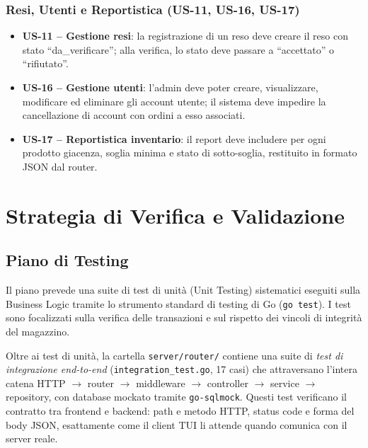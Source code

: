 \documentclass[a4paper,12pt]{article}
\begin{document}
\subsubsection*{Resi, Utenti e Reportistica (US-11, US-16, US-17)}
\begin{itemize}
    \item \textbf{US-11 -- Gestione resi}: la registrazione di un reso deve creare il reso con stato ``da\_verificare''; alla verifica, lo stato deve passare a ``accettato'' o ``rifiutato''.
    \item \textbf{US-16 -- Gestione utenti}: l'admin deve poter creare, visualizzare, modificare ed eliminare gli account utente; il sistema deve impedire la cancellazione di account con ordini a esso associati.
    \item \textbf{US-17 -- Reportistica inventario}: il report deve includere per ogni prodotto giacenza, soglia minima e stato di sotto-soglia, restituito in formato JSON dal router.
\end{itemize}

\section{Strategia di Verifica e Validazione}

\subsection{Piano di Testing}
Il piano prevede una suite di test di unità (Unit Testing) sistematici eseguiti sulla Business Logic tramite lo strumento standard di testing di Go (\texttt{go test}). I test sono focalizzati sulla verifica delle transazioni e sul rispetto dei vincoli di integrità del magazzino.

Oltre ai test di unità, la cartella \texttt{server/router/} contiene una suite di \emph{test di integrazione end-to-end} (\texttt{integration\_test.go}, 17 casi) che attraversano l'intera catena HTTP $\rightarrow$ router $\rightarrow$ middleware $\rightarrow$ controller $\rightarrow$ service $\rightarrow$ repository, con database mockato tramite \texttt{go-sqlmock}. Questi test verificano il contratto tra frontend e backend: path e metodo HTTP, status code e forma del body JSON, esattamente come il client TUI li attende quando comunica con il server reale.
\end{document}
